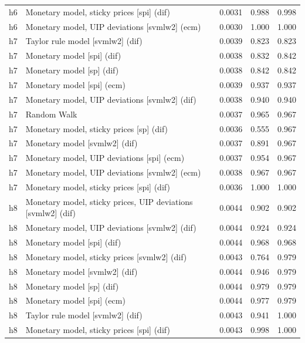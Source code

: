 \begin{ThreePartTable}
\begin{longtable}[t]{cp{5.5cm}ccc}
h6 & \raggedright Monetary model, sticky prices [spi] (dif) & 0.0031 & 0.988 & 0.998\\
h6 & \raggedright Monetary model, UIP deviations [svmlw2] (ecm) & 0.0030 & 1.000 & 1.000\\
\addlinespace
h7 & \raggedright Taylor rule model [svmlw2] (dif) & 0.0039 & 0.823 & 0.823\\
h7 & \raggedright Monetary model [spi] (dif) & 0.0038 & 0.832 & 0.842\\
h7 & \raggedright Monetary model [sp] (dif) & 0.0038 & 0.842 & 0.842\\
h7 & \raggedright Monetary model [spi] (ecm) & 0.0039 & 0.937 & 0.937\\
h7 & \raggedright Monetary model, UIP deviations [svmlw2] (dif) & 0.0038 & 0.940 & 0.940\\
h7 & \raggedright Random Walk & 0.0037 & 0.965 & 0.967\\
h7 & \raggedright Monetary model, sticky prices [sp] (dif) & 0.0036 & 0.555 & 0.967\\
h7 & \raggedright Monetary model [svmlw2] (dif) & 0.0037 & 0.891 & 0.967\\
h7 & \raggedright Monetary model, UIP deviations [spi] (ecm) & 0.0037 & 0.954 & 0.967\\
h7 & \raggedright Monetary model, UIP deviations [svmlw2] (ecm) & 0.0038 & 0.967 & 0.967\\
h7 & \raggedright Monetary model, sticky prices [spi] (dif) & 0.0036 & 1.000 & 1.000\\
\addlinespace
h8 & \raggedright Monetary model, sticky prices, UIP deviations [svmlw2] (dif) & 0.0044 & 0.902 & 0.902\\
h8 & \raggedright Monetary model, UIP deviations [svmlw2] (dif) & 0.0044 & 0.924 & 0.924\\
h8 & \raggedright Monetary model [spi] (dif) & 0.0044 & 0.968 & 0.968\\
h8 & \raggedright Monetary model, sticky prices [svmlw2] (dif) & 0.0043 & 0.764 & 0.979\\
h8 & \raggedright Monetary model [svmlw2] (dif) & 0.0044 & 0.946 & 0.979\\
h8 & \raggedright Monetary model [sp] (dif) & 0.0044 & 0.979 & 0.979\\
h8 & \raggedright Monetary model [spi] (ecm) & 0.0044 & 0.977 & 0.979\\
h8 & \raggedright Taylor rule model [svmlw2] (dif) & 0.0043 & 0.941 & 1.000\\
h8 & \raggedright Monetary model, sticky prices [spi] (dif) & 0.0043 & 0.998 & 1.000\\

\end{longtable}
\end{ThreePartTable}
